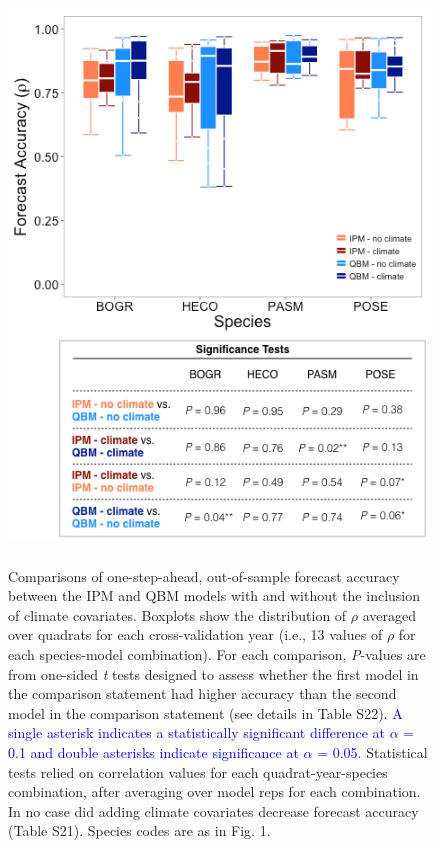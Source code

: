 \documentclass[12pt,]{article}
\begin{document}
\begin{figure}[!ht]
  \centering
      \includegraphics[height=6in]{./components/forecast_accuracy_mockup_boxplot.png}
  \caption{Comparisons of one-step-ahead, out-of-sample forecast accuracy between the IPM and QBM models with and without the inclusion of climate covariates. Boxplots show the distribution of $\rho$ averaged over quadrats for each cross-validation year (i.e., 13 values of $\rho$ for each species-model combination). For each comparison, \emph{P}-values are from one-sided \emph{t} tests designed to assess whether the first model in the comparison statement had higher accuracy than the second model in the comparison statement (see details in Table S22). \textcolor{blue}{A single asterisk indicates a statistically significant difference at $\alpha$ = 0.1 and double asterisks indicate significance at $\alpha$ = 0.05}. Statistical tests relied on correlation values for each quadrat-year-species combination, after averaging over model reps for each combination. In no case did adding climate covariates decrease forecast accuracy (Table S21). Species codes are as in Fig. 1.}
\end{figure}
\end{document}
